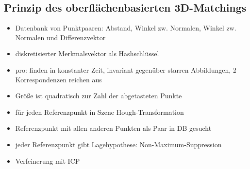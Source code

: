 \documentclass[11pt]{article}
\begin{document}
\subsection{Prinzip des oberflächenbasierten 3D-Matchings}
\begin{itemize}
    \item Datenbank von Punktpaaren: Abstand, Winkel zw. Normalen, Winkel zw. Normalen und Differenzvektor
    \item diskretisierter Merkmalsvektor als Hashschlüssel
    \item pro: finden in konstanter Zeit, invariant gegenüber starren Abbildungen, 2 Korrespondenzen reichen aus
    \item Größe ist quadratisch zur Zahl der abgetasteten Punkte
    \item für jeden Referenzpunkt in Szene Hough-Transformation
    \item Referenzpunkt mit allen anderen Punkten als Paar in DB gesucht
    \item jeder Referenzpunkt gibt Lagehypothese: Non-Maximum-Suppression
    \item Verfeinerung mit ICP
\end{itemize}
\end{document}
